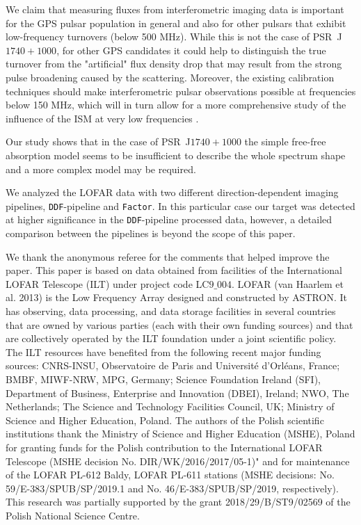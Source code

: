 \documentclass[manuscript]{aastex63}
\begin{document}
We claim that measuring fluxes from interferometric imaging data is important for the GPS pulsar population in general and also for other pulsars that exhibit low-frequency turnovers (below 500 MHz). While this is not the case of PSR~J$1740+1000$, for other GPS candidates it could help to distinguish the true turnover from the "artificial" flux density drop that may result from the strong pulse broadening caused by the scattering. Moreover, the existing calibration techniques should make interferometric pulsar observations possible at frequencies below 150 MHz, which will in turn allow for a more comprehensive study of the influence of the ISM at very low frequencies \citep{2018DeGasparin}.  

Our study shows that in the case of PSR~J$1740+1000$ the simple free-free absorption model seems to be insufficient to describe the whole spectrum shape and a more complex model may be required. 

We analyzed the LOFAR data with two different direction-dependent imaging pipelines, \texttt{DDF}-pipeline and \texttt{Factor}. In  this particular case our target was detected at higher significance in the \texttt{DDF}-pipeline processed data, however, a detailed comparison between the pipelines is beyond the scope of this paper.   


\acknowledgments
We thank the anonymous referee for the comments that helped improve
the paper. This paper is based on data obtained from facilities of the International LOFAR Telescope (ILT) under project code LC$9\_004$. LOFAR (van Haarlem et al. 2013) is the Low Frequency Array designed and constructed by ASTRON. It has observing, data processing, and data storage facilities in several countries that are owned by various parties (each with their own funding sources) and that are collectively operated by the ILT foundation under a joint scientific policy. The ILT resources have benefited from the following recent major funding sources: CNRS-INSU, Observatoire de Paris and Université d'Orléans, France; BMBF, MIWF-NRW, MPG, Germany; Science Foundation Ireland (SFI), Department of Business, Enterprise and Innovation (DBEI), Ireland; NWO, The Netherlands; The Science and Technology Facilities Council, UK; Ministry of Science and Higher Education, Poland. The authors of the Polish scientific institutions thank the Ministry of Science and Higher Education (MSHE), Poland for granting funds for the Polish contribution to the International LOFAR Telescope (MSHE decision No. DIR/WK/2016/2017/05-1)" and for maintenance of the LOFAR PL-612 Baldy, LOFAR PL-611 stations (MSHE decisions: No. 59/E-383/SPUB/SP/2019.1 and No. 46/E-383/SPUB/SP/2019, respectively). This research was partially supported by the grant 2018/29/B/ST9/02569 of the Polish National Science Centre.
\end{document}
